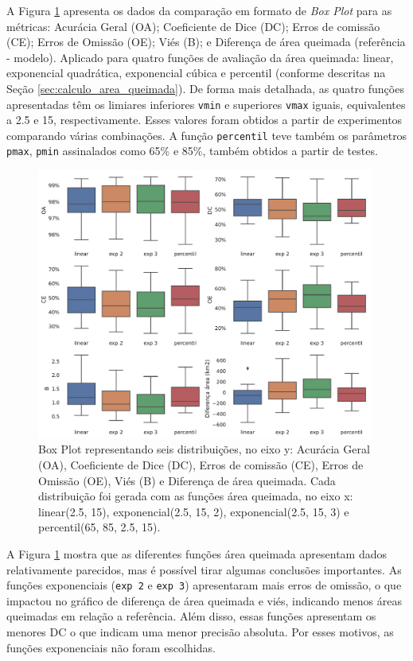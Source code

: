 \documentclass[cic,tc]{iiufrgs}
\begin{document}
A Figura \ref{fig:comparacao_evals} apresenta os dados da comparação em formato de \textit{Box Plot} para as métricas: Acurácia Geral (OA); Coeficiente de Dice (DC); Erros de comissão (CE); Erros de Omissão (OE); Viés (B); e Diferença de área queimada (referência - modelo). Aplicado para quatro funções de avaliação da área queimada: linear, exponencial quadrática, exponencial cúbica e percentil (conforme descritas na Seção \ref{sec:calculo_area_queimada}). De forma mais detalhada, as quatro funções apresentadas têm os limiares inferiores \texttt{vmin} e superiores \texttt{vmax} iguais, equivalentes a 2.5 e 15, respectivamente. Esses valores foram obtidos a partir de experimentos comparando várias combinações. A função \texttt{percentil} teve também os parâmetros \texttt{pmax}, \texttt{pmin} assinalados como 65\% e 85\%, também obtidos a partir de testes. 

\begin{figure}[!htb]
    \caption{Box Plot representando seis distribuições, no eixo y: Acurácia Geral (OA), Coeficiente de Dice (DC), Erros de comissão (CE), Erros de Omissão (OE), Viés (B) e Diferença de área queimada. Cada distribuição foi gerada com as funções área queimada, no eixo x: linear(2.5, 15), exponencial(2.5, 15, 2), exponencial(2.5, 15, 3) e percentil(65, 85, 2.5, 15).}
    \begin{center}
        \includegraphics[width=30em]{comparacao_evals}
    \end{center}
    \label{fig:comparacao_evals}
\end{figure}

A Figura \ref{fig:comparacao_evals} mostra que as diferentes funções área queimada apresentam dados relativamente parecidos, mas é possível tirar algumas conclusões importantes. As funções exponenciais (\texttt{exp 2} e \texttt{exp 3}) apresentaram mais erros de omissão, o que impactou no gráfico de diferença de área queimada e viés, indicando menos áreas queimadas em relação a referência. Além disso, essas funções apresentam os menores DC o que indicam uma menor precisão absoluta. Por esses motivos, as funções exponenciais não foram escolhidas.
\end{document}
